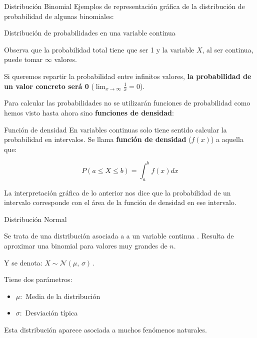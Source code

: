\documentclass[11pt]{beamer}
\begin{document}
\begin{frame}{Distribución Binomial}
Ejemplos de representación gráfica de la distribución de probabilidad de algunas binomiales:    
         

    
\end{frame}


\begin{frame}{Distribución de probabilidades en una variable continua}

Observa que la probabilidad total tiene que ser 1 y la variable $X$, al ser continua, puede tomar $\infty$ valores.
\begin{block}{}
Si queremos repartir la probabilidad entre infinitos valores, \textbf{la probabilidad de un valor concreto será 0} ($\lim_{x \to \infty}\frac{1}{x}=0$). 
\end{block}
   

Para calcular las probabilidades no se utilizarán funciones de probabilidad como hemos visto hasta ahora sino \textbf{funciones de densidad}:
\end{frame}

\begin{frame}{Función de densidad}
En variables continuas solo tiene sentido calcular la probabilidad en intervalos.
Se llama \textbf{función de densidad} ($f(x)$) a aquella que: 
\begin{block}{}
$$P\left(a\leq X \leq b \right) = \int_{a}^{b} f(x) dx$$
\end{block}    


La interpretación gráfica de lo anterior nos dice que la probabilidad de un intervalo corresponde con el área de la función de densidad en ese intervalo.
\begin{center}


\end{center}
\end{frame}

\begin{frame}
{Distribución Normal}

Se trata de una distribución asociada a a un variable continua . Resulta de aproximar una binomial para valores muy grandes de $n$. 
\begin{block}{} Y se denota: $
X \sim \mathcal{N}(\mu,\,\sigma)\,.
    $ 
\end{block}
\pause
Tiene dos parámetros:
\begin{itemize} [<+->]
    \item $\mu :$ Media de la distribución
    \item $\sigma :$ Desviación típica
\end{itemize}

\pause    
Esta distribución aparece asociada a muchos fenómenos naturales. 
\end{frame}
\end{document}
